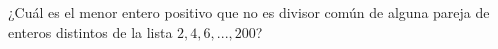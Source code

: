 ¿Cuál es el menor entero positivo que no es divisor común de alguna pareja de enteros distintos de la lista $2,4,6,...,200$?